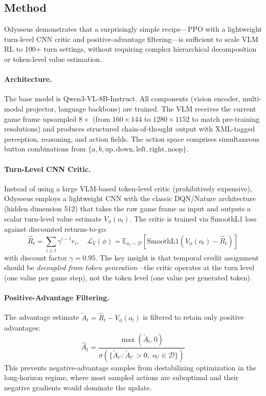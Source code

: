 \documentclass[11pt]{article}
\begin{document}
\subsection{Method}

Odysseus demonstrates that a surprisingly simple recipe---PPO with a lightweight turn-level CNN critic and positive-advantage filtering---is sufficient to scale VLM RL to 100+ turn settings, without requiring complex hierarchical decomposition or token-level value estimation.

\paragraph{Architecture.}
The base model is Qwen3-VL-8B-Instruct. All components (vision encoder, multi-modal projector, language backbone) are trained. The VLM receives the current game frame upsampled $8\times$ (from $160 \times 144$ to $1280 \times 1152$ to match pre-training resolutions) and produces structured chain-of-thought output with XML-tagged perception, reasoning, and action fields. The action space comprises simultaneous button combinations from $\{a, b, \mathrm{up}, \mathrm{down}, \mathrm{left}, \mathrm{right}, \mathrm{noop}\}$.

\paragraph{Turn-Level CNN Critic.}
Instead of using a large VLM-based token-level critic (prohibitively expensive), Odysseus employs a lightweight CNN with the classic DQN/Nature architecture (hidden dimension 512) that takes the raw game frame as input and outputs a scalar turn-level value estimate $V_\phi(o_t)$. The critic is trained via SmoothL1 loss against discounted returns-to-go:
\begin{equation}
    \hat{R}_t = \sum_{i \geq t} \gamma^{i-t} r_i, \quad \mathcal{L}_V(\phi) = \mathbb{E}_{o_t \sim \mathcal{D}}\!\left[\mathrm{SmoothL1}(V_\phi(o_t) - \hat{R}_t)\right]
\end{equation}
with discount factor $\gamma = 0.95$. The key insight is that temporal credit assignment should be \emph{decoupled from token generation}---the critic operates at the turn level (one value per game step), not the token level (one value per generated token).

\paragraph{Positive-Advantage Filtering.}
The advantage estimate $\tilde{A}_t = \hat{R}_t - V_\phi(o_t)$ is filtered to retain only positive advantages:
\begin{equation}
    \hat{A}_t = \frac{\max(\tilde{A}_t, 0)}{\sigma(\{\tilde{A}_{t'} : \tilde{A}_{t'} > 0,\; o_{t'} \in \mathcal{D}\})}
\end{equation}
This prevents negative-advantage samples from destabilizing optimization in the long-horizon regime, where most sampled actions are suboptimal and their negative gradients would dominate the update.
\end{document}
